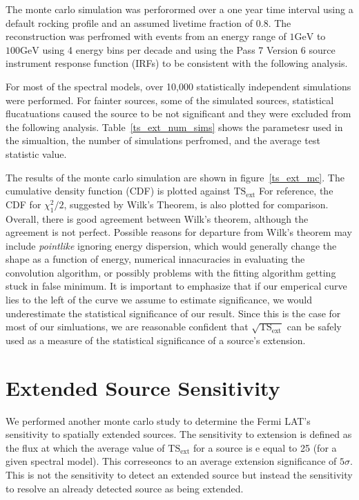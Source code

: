 \documentclass[preprint]{aastex}
\newcommand{\gev}{\text{GeV}\xspace}
\newcommand{\tsext}{\ensuremath{\text{TS}_\text{ext}}\xspace}
\newcommand{\pointlike}{{\em pointlike}\xspace}
\begin{document}
The monte carlo simulation was perforormed over a one year time interval using
a default rocking profile and an assumed livetime fraction of 0.8.
The reconstruction was perfromed with events from an energy range of
$1\gev$ to $100\gev$ using 4 energy bins per decade and using the Pass 7 Version 6
source instrument response function (IRFs) to be consistent with the following analysis.

For most of the spectral models, over 10,000 statistically independent simulations were performed.
For fainter sources, some of the simulated sources, statistical flucatuations
caused the source to be not significant and they were excluded from the following analysis.
Table~\ref{ts_ext_num_sims} shows the parametesr used in the simualtion,
the number of simulations perfromed, and the average test statistic value.


The results of the monte carlo simulation are shown in
figure~\ref{ts_ext_mc}.  The cumulative density function (CDF) is plotted
against $\tsext$ For reference, the CDF for $\chi^2_1/2$,
suggested by Wilk's Theorem, is also plotted for comparison. Overall,
there is good agreement between Wilk's theorem, although the agreement
is not perfect.  Possible reasons for departure from Wilk's theorem may
include \pointlike ignoring energy dispersion, which would generally change
the shape as a function of energy, numerical innacuracies in evaluating
the convolution algorithm, or possibly problems with the fitting algorithm
getting stuck in false minimum. It is important to emphasize that if
our emperical curve lies to the left of the curve we assume to estimate
significance, we would underestimate the statistical significance of
our result. Since this is the case for most of our simluations, we are
reasonable confident that $\sqrt{\tsext}$ can be safely
used as a measure of the statistical significance of a source's extension.

\section{Extended Source Sensitivity}

We performed another monte carlo study to determine the Fermi LAT's
sensitivity to spatially extended sources. The sensitivity to extension
is defined as the flux at which 
the average value of $\tsext$ for a source is 
e equal to 25 (for a given spectral model). This correseoncs
to an average extension significance of $5\sigma$.  This is not the
sensitivity to detect an extended source but instead the sensitivity to
resolve an already detected source as being extended.  
\end{document}
